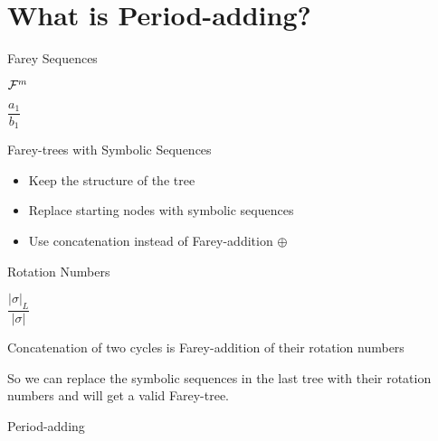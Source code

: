 \section{What is Period-adding?}

\begin{frame}{Farey Sequences}
    \begin{definition}
        $\mathcal{F}^m$
    \end{definition}
    \begin{theorem}
        $\dfrac{a_1}{b_1}$
    \end{theorem}
\end{frame}

\begin{frame}{Farey-trees with Symbolic Sequences}
    \begin{itemize}
        \item Keep the structure of the tree
        \item Replace starting nodes with symbolic sequences
        \item Use concatenation instead of Farey-addition $\oplus$
    \end{itemize}
\end{frame}

\begin{frame}{Rotation Numbers}
    \begin{definition}
        $\dfrac{|\sigma|_L}{|\sigma|}$
    \end{definition}
    \begin{theorem}
        Concatenation of two cycles is Farey-addition of their rotation numbers
    \end{theorem}
    So we can replace the symbolic sequences in the last tree with their rotation numbers and will get a valid Farey-tree.
\end{frame}

\begin{frame}{Period-adding}
\end{frame}